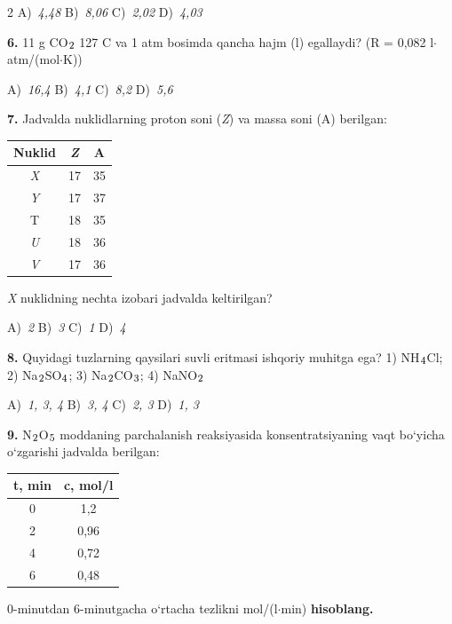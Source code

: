 \documentclass[11pt,a4paper]{article}
\renewcommand{\textsubscript}[1]{\ensuremath{_{\text{\fontsize{8}{8}\selectfont #1}}}}
\begin{document}
\begin{multicols}{2}
\noindent A)~\textsl{4,48} \hfill B)~\textsl{8,06} \hfill C)~\textsl{2,02} \hfill D)~\textsl{4,03}\par
\vspace{4pt}
\noindent\textbf{6.} 11 g CO\textsubscript{2} 127 \textdegree{}C va 1 atm bosimda qancha hajm (l) egallaydi? (R = 0,082 l$\cdot$atm/(mol$\cdot$K))

\noindent A)~\textsl{16,4} \hfill B)~\textsl{4,1} \hfill C)~\textsl{8,2} \hfill D)~\textsl{5,6}\par
\vspace{4pt}
\noindent\textbf{7.} Jadvalda nuklidlarning proton soni (\textit{Z}) va massa soni (A) berilgan:
\begin{center}
\renewcommand{\arraystretch}{1.15}
\begin{tabular}{|c|c|c|}\hline
\textbf{Nuklid} & \textbf{\textit{Z}} & \textbf{A} \\ \hline
\textit{X} & 17 & 35 \\ \hline
\textit{Y} & 17 & 37 \\ \hline
T & 18 & 35 \\ \hline
\textit{U} & 18 & 36 \\ \hline
\textit{V} & 17 & 36 \\ \hline
\end{tabular}
\end{center}
\textit{X} nuklidning nechta izobari jadvalda keltirilgan?

\noindent A)~\textsl{2} \hfill B)~\textsl{3} \hfill C)~\textsl{1} \hfill D)~\textsl{4}\par
\vspace{4pt}
\noindent\textbf{8.} Quyidagi tuzlarning qaysilari suvli eritmasi ishqoriy muhitga ega? 1) NH\textsubscript{4}Cl; 2) Na\textsubscript{2}SO\textsubscript{4}; 3) Na\textsubscript{2}CO\textsubscript{3}; 4) NaNO\textsubscript{2}

\noindent A)~\textsl{1, 3, 4} \hfill B)~\textsl{3, 4} \hfill C)~\textsl{2, 3} \hfill D)~\textsl{1, 3}\par
\vspace{4pt}
\noindent\textbf{9.} N\textsubscript{2}O\textsubscript{5} moddaning parchalanish reaksiyasida konsentratsiyaning vaqt bo`yicha o`zgarishi jadvalda berilgan:
\begin{center}
\renewcommand{\arraystretch}{1.15}
\begin{tabular}{|c|c|}\hline
\textbf{t, min} & \textbf{c, mol/l} \\ \hline
0 & 1,2 \\ \hline
2 & 0,96 \\ \hline
4 & 0,72 \\ \hline
6 & 0,48 \\ \hline
\end{tabular}
\end{center}
0-minutdan 6-minutgacha o`rtacha tezlikni mol/(l$\cdot$min) \textbf{hisoblang.}


\end{multicols}
\end{document}

